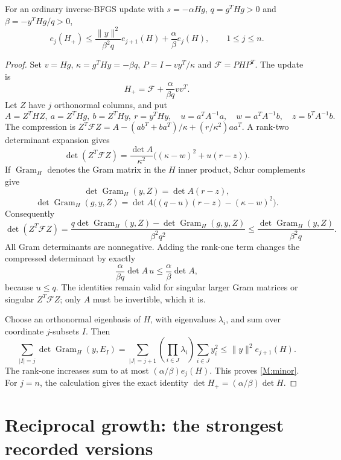 \begin{theorem}\label{M:hierarchy}
For an ordinary inverse-BFGS update with $s=-\alpha Hg$, $q=g^THg>0$ and $\beta=-y^THg/q>0$,
\begin{equation}\label{M:minor}
 e_j(H_+)\le \frac{\|y\|^2}{\beta^2q}e_{j+1}(H)+\frac\alpha\beta e_j(H),\qquad1\le j\le n.
\end{equation}
\end{theorem}
\begin{proof}
Set $v=Hg$, $\kappa=g^THy=-\beta q$, $P=I-vy^T/\kappa$ and $\mathcal F=PHP^T$. The update is
\[
 H_+=\mathcal F+\frac{\alpha}{\beta q}vv^T.
\]
Let $Z$ have $j$ orthonormal columns, and put
\[
 A=Z^THZ,\ a=Z^THg,\ b=Z^THy,\ r=y^THy,
 \quad u=a^TA^{-1}a,\quad w=a^TA^{-1}b,\quad z=b^TA^{-1}b.
\]
The compression is $Z^T\mathcal FZ=A-(ab^T+ba^T)/\kappa+(r/\kappa^2)aa^T$. A rank-two determinant expansion gives
\[
 \det(Z^T\mathcal FZ)=\frac{\det A}{\kappa^2}\bigl((\kappa-w)^2+u(r-z)\bigr).
\]
If $\operatorname{Gram}_H$ denotes the Gram matrix in the $H$ inner product, Schur complements give
\[
 \det\operatorname{Gram}_H(y,Z)=\det A(r-z),
\]
\[
 \det\operatorname{Gram}_H(g,y,Z)
 =\det A\bigl((q-u)(r-z)-(\kappa-w)^2\bigr).
\]
Consequently
\begin{equation}\label{M:compression}
 \det(Z^T\mathcal FZ)
 =\frac{q\det\operatorname{Gram}_H(y,Z)-\det\operatorname{Gram}_H(g,y,Z)}{\beta^2q^2}
 \le\frac{\det\operatorname{Gram}_H(y,Z)}{\beta^2q}.
\end{equation}
All Gram determinants are nonnegative. Adding the rank-one term changes the compressed determinant by exactly
\[
 \frac{\alpha}{\beta q}\det A\,u\le\frac\alpha\beta\det A,
\]
because $u\le q$. The identities remain valid for singular larger Gram matrices or singular $Z^T\mathcal FZ$; only $A$ must be invertible, which it is.

Choose an orthonormal eigenbasis of $H$, with eigenvalues $\lambda_i$, and sum over coordinate $j$-subsets $I$. Then
\[
 \sum_{|I|=j}\det\operatorname{Gram}_H(y,E_I)
 =\sum_{|J|=j+1}\left(\prod_{i\in J}\lambda_i\right)\sum_{i\in J}y_i^2
 \le\|y\|^2e_{j+1}(H).
\]
The rank-one increases sum to at most $(\alpha/\beta)e_j(H)$. This proves \eqref{M:minor}. For $j=n$, the calculation gives the exact identity $\det H_+=(\alpha/\beta)\det H$.
\end{proof}

\section{Reciprocal growth: the strongest recorded versions}
\label{M:reciprocal}
